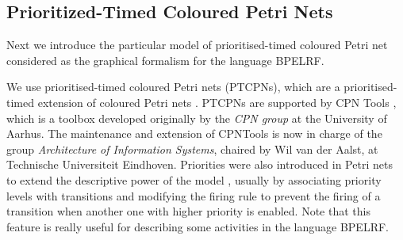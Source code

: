 \subsection{Prioritized-Timed Coloured Petri Nets}\label{ptcpns}
Next we introduce the particular model of prioritised-timed
coloured Petri net considered as the graphical formalism for the language BPELRF. 
 
We use prioritised-timed coloured Petri nets (PTCPNs), 
which are
a prioritised-timed extension of coloured Petri nets \cite{Jensen97}. PTCPNs 
are supported by CPN Tools \cite{CPNTools}, which is a toolbox
developed originally by the \emph{CPN group} at the University of Aarhus. The maintenance and extension of CPNTools is now in charge
of the group \emph{Architecture of Information Systems}, chaired by Wil van der Aalst, at Technische Universiteit Eindhoven.
Priorities were also introduced in Petri nets to extend the descriptive 
power of the model \cite{Bau96,BestK92,Pet81}, usually by
associating priority levels with transitions and modifying the firing
rule to prevent the firing of a transition when another one with
higher priority is enabled. Note that this feature is really useful  for describing some activities
in the language BPELRF.


